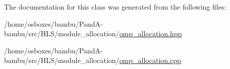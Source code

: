 The documentation for this class was generated from the following files\+:\begin{DoxyCompactItemize}
\item 
/home/osboxes/bambu/\+Pand\+A-\/bambu/src/\+H\+L\+S/module\+\_\+allocation/\hyperlink{omp__allocation_8hpp}{omp\+\_\+allocation.\+hpp}\item 
/home/osboxes/bambu/\+Pand\+A-\/bambu/src/\+H\+L\+S/module\+\_\+allocation/\hyperlink{omp__allocation_8cpp}{omp\+\_\+allocation.\+cpp}\end{DoxyCompactItemize}
